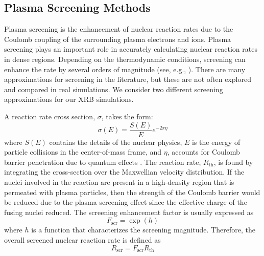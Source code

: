 \documentclass[preprint,times,tighten,linenumbers,trackchanges]{aastex631}
\begin{document}


\subsection{Plasma Screening Methods}\label{Sec:screening}

Plasma screening is the enhancement of nuclear reaction rates due to the Coulomb coupling of the surrounding plasma electrons and ions. Plasma screening plays an important role in accurately calculating nuclear reaction rates in dense regions.
Depending on the thermodynamic conditions, 
screening can enhance the rate by several orders
of magnitude (see, e.g., \citealt{woosley-ignition}).
There are many approximations for screening in the literature, but these are not
often explored and compared in real simulations.
We consider two different screening approximations
for our XRB simulations.

A reaction rate cross section, $\sigma$, takes the form:
\begin{equation}
    \sigma(E) = \frac{S(E)}{E} e^{-2\pi \eta}
\end{equation}
where $S(E)$ contains the details of the nuclear physics, $E$ is the energy of particle collisions in the center-of-mass frame, and $\eta$, accounts for Coulomb barrier penetration due to quantum effects \citep{Newton2007}. The reaction rate, $R_{\textrm{th}}$, is found by integrating the cross-section over the Maxwellian velocity distribution.  If the nuclei involved in the reaction are present in a high-density region that is permeated with plasma particles, then the strength of the Coulomb barrier would be reduced due to the plasma screening effect since the effective charge of the fusing nuclei  reduced. The screening enhancement factor is usually expressed as
\begin{equation}
    F_{\textrm{scr}} = \exp{(h)}
\end{equation}
where $h$ is a function that characterizes the screening magnitude. Therefore, the overall screened nuclear reaction rate is defined as
\begin{equation}\label{Eq:screened_rate}
    R_{\textrm{scr}} = F_{\textrm{scr}}R_{\textrm{th}}
\end{equation}
\end{document}
